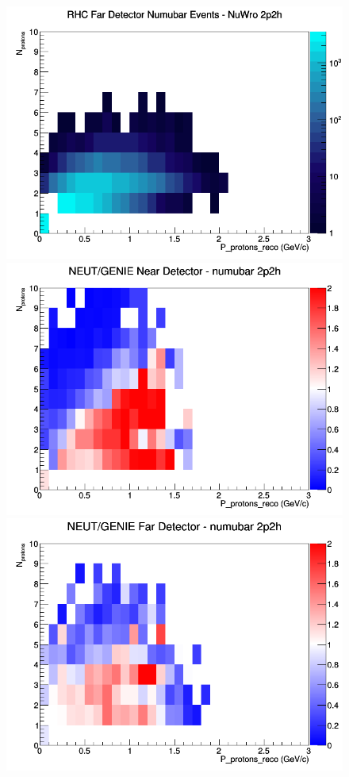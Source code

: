 \documentclass[12pt]{article}
\begin{document}
\begin{figure}[h]
\endminipage
{}
\includegraphics[width=\linewidth]{eff_N_P/GAr/protons/2p2h_RHC_FD_numubar_N_P_NuWro.png}
\endminipage
\newline
{}
\includegraphics[width=\linewidth]{eff_N_P/GAr/protons/ratios/2p2h_NEUT_GENIE_numubar_near_N_P.png}
\endminipage
{}
\includegraphics[width=\linewidth]{eff_N_P/GAr/protons/ratios/2p2h_NEUT_GENIE_numubar_far_N_P.png}

\end{figure}
\end{document}

